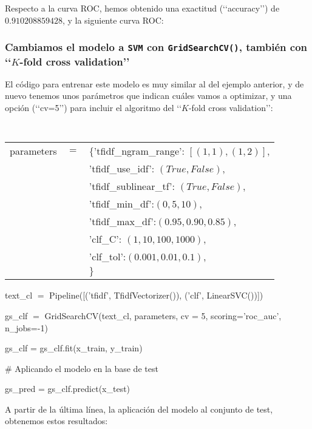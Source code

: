 Respecto a la curva ROC, hemos obtenido
una exactitud (\lq\lq accuracy\rq\rq)
de $0.910208859428$, y la siguiente curva ROC:



\subsubsection{Cambiamos el modelo a {\tt SVM} con {\tt GridSearchCV()},
también con \lq\lq $K$-fold cross validation\rq\rq}
El código para entrenar este modelo es muy similar al del ejemplo anterior,
y de nuevo tenemos unos parámetros que indican cuáles vamos a optimizar, y una opción
(\lq\lq cv=5\rq\rq) para incluir el algoritmo del \lq\lq $K$-fold cross validation\rq\rq:

\medskip

{\tt
\noindent\begin{tabular}{rcl}
parameters &$=$& $\{$'tfidf\_ngram\_range': $[(1,1),(1,2)]$,\\
              &&'tfidf\_use\_idf': $(True, False)$,\\
              &&'tfidf\_sublinear\_tf': $(True, False)$,\\
              &&'tfidf\_min\_df':$(0, 5, 10)$,\\
              &&'tfidf\_max\_df':$(0.95, 0.90, 0.85)$,\\
              &&'clf\_C': $(1, 10, 100, 1000)$,\\
              &&'clf\_tol':$(0.001, 0.01, 0.1)$,\\
			  &&$\}$
\end{tabular}

\noindent text\_cl $=$ Pipeline([('tfidf', TfidfVectorizer()),
					('clf', LinearSVC())])



\noindent gs\_clf $=$ GridSearchCV(text\_cl, parameters, cv = 5, scoring='roc\_auc', n\_jobs=-1)

\noindent gs\_clf = gs\_clf.fit(x\_train, y\_train)
    
\noindent\# Aplicando el modelo en la base de test

\noindent gs\_pred = gs\_clf.predict(x\_test)

}

A partir de la última línea, la aplicación del modelo al conjunto de test, obtenemos estos resultados:


